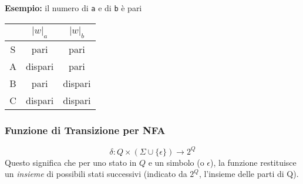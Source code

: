         \vspace{1em}
        
        \textbf{Esempio:} il numero di \texttt{a} e di \texttt{b} è pari
        
        \begin{minipage}{0.4\textwidth}
        \centering
        \begin{tabular}{|c|c|c|}
        \hline
             & $|w|_a$ & $|w|_b$ \\
        \hline
         S & pari    & pari    \\
        \hline
         A & dispari & pari    \\
        \hline
         B & pari    & dispari \\
        \hline
         C & dispari & dispari \\
        \hline
        \end{tabular}
        \end{minipage}%
        \hfill
        \begin{minipage}{0.58\textwidth}
        \centering
        \end{minipage}
        
\subsubsection{Funzione di Transizione per NFA}
\[ \delta: Q \times (\Sigma \cup \{\epsilon\}) \rightarrow 2^Q \]
Questo significa che per uno stato in $Q$ e un simbolo (o $\epsilon$), la funzione restituisce un \textit{insieme} di possibili stati successivi (indicato da $2^Q$, l'insieme delle parti di Q). 
